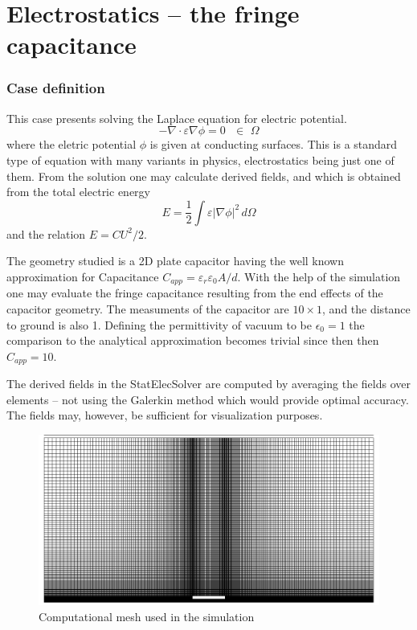 \chapter{Electrostatics -- the fringe capacitance}


\subsection*{Case definition}

This case presents solving the Laplace equation for electric potential.
\begin{equation}
  - \nabla \cdot \varepsilon \nabla \phi = 0  \, \, \, \, \in \, \, \Omega
\end{equation}
where the eletric potential $\phi$ is given at conducting surfaces.
This is a standard type of equation with many variants in physics, electrostatics being just one of them.
From the solution one may calculate 
derived fields, and 
which is obtained from the total electric energy 
\begin{equation}
  E=\frac{1}{2} \int \varepsilon | \nabla \phi |^2 \, d\Omega
\end{equation}
and the relation $E=CU^2/2$.

The geometry studied 
is a 2D plate capacitor having the well known approximation
for Capacitance $C_{app}=\varepsilon_r\varepsilon_0 A/d$.
With the help of the
simulation one may evaluate the fringe capacitance resulting
from the end effects of the capacitor geometry.
The measuments of the capacitor are $10 \times 1$, and the distance to
ground is also 1. Defining the permittivity of vacuum to be 
$\epsilon_0 = 1$ the comparison to the analytical approximation
becomes trivial since then then $C_{app} = 10$. 

The derived fields in the StatElecSolver are computed 
by averaging the fields over elements -- not using the 
Galerkin method which would provide optimal accuracy. The fields 
may, however, be sufficient for visualization purposes. 



\begin{figure}[h]
\centering
\includegraphics[width=120 mm]{mesh}
\caption{Computational mesh used in the simulation}\label{fg:rb_geometry}
\end{figure}  




